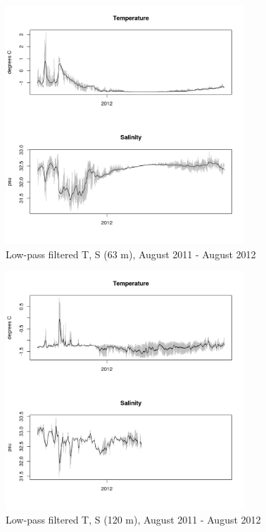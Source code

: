 \documentclass[12pt]{dforeport}
\begin{document}
\begin{figure}  
\centering
\includegraphics[width = 0.8\textwidth]{./figures/20_lpf_TS_63m_2011_2012.png}
\caption[Low-pass filtered T, S (63 m), 2011-2012]{Low-pass filtered T, S (63 m), August 2011 - August 2012}
\label{f:ctd_63_lpf_2011_2012}
\end{figure}

\begin{figure}  
\centering
\includegraphics[width = 0.8\textwidth]{./figures/21_lpf_TS_120m_2011_2012.png}
\caption[Low-pass filtered T, S (120 m), 2011-2012]{Low-pass filtered T, S (120 m), August 2011 - August 2012}
\label{f:ctd_120_lpf_2011_2012}
\end{figure}
\end{document}
